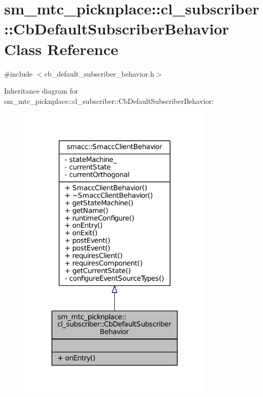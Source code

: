 \hypertarget{classsm__mtc__picknplace_1_1cl__subscriber_1_1CbDefaultSubscriberBehavior}{}\section{sm\+\_\+mtc\+\_\+picknplace\+:\+:cl\+\_\+subscriber\+:\+:Cb\+Default\+Subscriber\+Behavior Class Reference}
\label{classsm__mtc__picknplace_1_1cl__subscriber_1_1CbDefaultSubscriberBehavior}


{\ttfamily \#include $<$cb\+\_\+default\+\_\+subscriber\+\_\+behavior.\+h$>$}



Inheritance diagram for sm\+\_\+mtc\+\_\+picknplace\+:\+:cl\+\_\+subscriber\+:\+:Cb\+Default\+Subscriber\+Behavior\+:
\nopagebreak
\begin{figure}[H]
\begin{center}
\leavevmode
\includegraphics[width=263pt]{classsm__mtc__picknplace_1_1cl__subscriber_1_1CbDefaultSubscriberBehavior__inherit__graph}
\end{center}
\end{figure}


